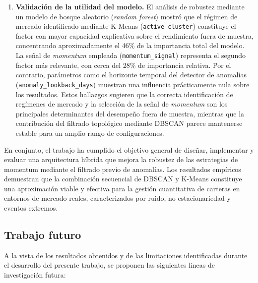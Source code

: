 \begin{enumerate}
    \item \textbf{Validación de la utilidad del modelo.} El análisis de
    robustez mediante un modelo de bosque aleatorio (\textit{random forest})
    mostró que el régimen de mercado identificado mediante K-Means
    (\texttt{active\_cluster}) constituye el factor con mayor capacidad
    explicativa sobre el rendimiento fuera de muestra, concentrando
    aproximadamente el 46\% de la importancia total del modelo. La señal de
    \textit{momentum} empleada (\texttt{momentum\_signal}) representa el
    segundo factor más relevante, con cerca del 28\% de importancia
    relativa. Por el contrario, parámetros como el horizonte temporal del
    detector de anomalías (\texttt{anomaly\_lookback\_days}) muestran una
    influencia prácticamente nula sobre los resultados. Estos hallazgos
    sugieren que la correcta identificación de regímenes de mercado y la
    selección de la señal de \textit{momentum} son los principales
    determinantes del desempeño fuera de muestra, mientras que la
    contribución del filtrado topológico mediante DBSCAN parece mantenerse
    estable para un amplio rango de configuraciones.

\end{enumerate}

En conjunto, el trabajo ha cumplido el objetivo general de diseñar, 
implementar y evaluar una arquitectura híbrida que mejora la robustez 
de las estrategias de momentum mediante el filtrado previo de anomalías. 
Los resultados empíricos demuestran que la combinación secuencial de 
DBSCAN y K-Means constituye una aproximación viable y efectiva para la 
gestión cuantitativa de carteras en entornos de mercado reales, 
caracterizados por ruido, no estacionariedad y eventos extremos.

\subsection{Trabajo futuro}
\label{sec:trabajo_futuro}

A la vista de los resultados obtenidos y de las limitaciones 
identificadas durante el desarrollo del presente trabajo, se proponen 
las siguientes líneas de investigación futura:

